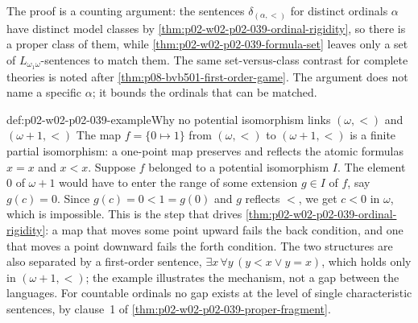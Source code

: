 The proof is a counting argument: the sentences \(\delta_{(\alpha,<)}\) for
distinct ordinals \(\alpha\) have distinct model classes by
\cref{thm:p02-w02-p02-039-ordinal-rigidity}, so there is a proper class of
them, while \cref{thm:p02-w02-p02-039-formula-set} leaves only a set of
\(L_{\omega_1\omega}\)-sentences to match them.  The same set-versus-class
contrast for complete theories is noted after
\cref{thm:p08-bvb501-first-order-game}.  The argument does not name a
specific \(\alpha\); it bounds the ordinals that can be matched.

\begin{hbexample}{def:p02-w02-p02-039-example}{Why no potential isomorphism links \((\omega,<)\) and \((\omega+1,<)\)}
The map \(f=\{0\mapsto1\}\) from \((\omega,<)\) to \((\omega+1,<)\) is a
finite partial isomorphism: a one-point map preserves and reflects the
atomic formulas \(x=x\) and \(x<x\).  Suppose \(f\) belonged to a potential
isomorphism \(I\).  The element \(0\) of \(\omega+1\) would have to enter
the range of some extension \(g\in I\) of \(f\), say \(g(c)=0\).  Since
\(g(c)=0<1=g(0)\) and \(g\) reflects \(<\), we get \(c<0\) in \(\omega\),
which is impossible.  This is the step that drives
\cref{thm:p02-w02-p02-039-ordinal-rigidity}: a map that moves some point
upward fails the back condition, and one that moves a point downward fails
the forth condition.  The two structures are also separated by a
first-order sentence, \(\exists x\,\forall y\,(y<x\lor y=x)\), which holds
only in \((\omega+1,<)\); the example illustrates the mechanism, not a gap
between the languages.  For countable ordinals no gap exists at the level of
single characteristic sentences, by clause~1 of
\cref{thm:p02-w02-p02-039-proper-fragment}.
\end{hbexample}

